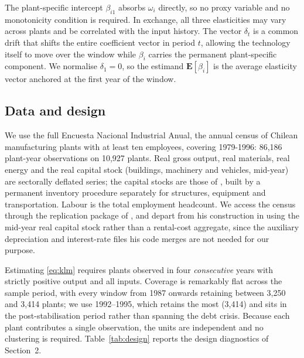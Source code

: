 \documentclass{article}
\begin{document}
The plant-specific intercept $\beta_{i1}$ absorbs $\omega_i$ directly, so no
proxy variable and no monotonicity condition is required. In exchange, all
three elasticities may vary across plants and be correlated with the input
history. The vector $\delta_t$ is a common drift that shifts the entire
coefficient vector in period $t$, allowing the technology itself to move over
the window while $\beta_i$ carries the permanent plant-specific component. We
normalise $\delta_1 = 0$, so the estimand $\mathbf{E}[\beta_i]$ is the average
elasticity vector anchored at the first year of the window.



\subsection{Data and design}

We use the full Encuesta Nacional Industrial Anual, the annual census of
Chilean manufacturing plants with at least ten employees, covering 1979-1996:
86{,}186 plant-year observations on 10{,}927 plants. Real gross output, real
materials, real energy and the real capital stock (buildings, machinery and
vehicles, mid-year) are sectorally deflated series; the capital stocks are
those of \citet{Greenstreet2007}, built by a permanent inventory procedure
separately for structures, equipment and transportation. Labour is the total
employment headcount. We access the census through the replication package of
\citet{Raval2023}, and depart from his construction in using the mid-year real
capital stock rather than a rental-cost aggregate, since the auxiliary
depreciation and interest-rate files his code merges are not needed for our
purpose.

Estimating \eqref{eq:klm} requires plants observed in four \emph{consecutive}
years with strictly positive output and all inputs. Coverage is remarkably flat
across the sample period, with every window from 1987 onwards retaining between
3{,}250 and 3{,}414 plants; we use 1992--1995, which retains the most
(3{,}414) and sits in the post-stabilisation period rather than spanning the
debt crisis. Because each plant contributes a single observation, the units are
independent and no clustering is required. Table~\ref{tab:design} reports the
design diagnostics of Section~2.
\end{document}
